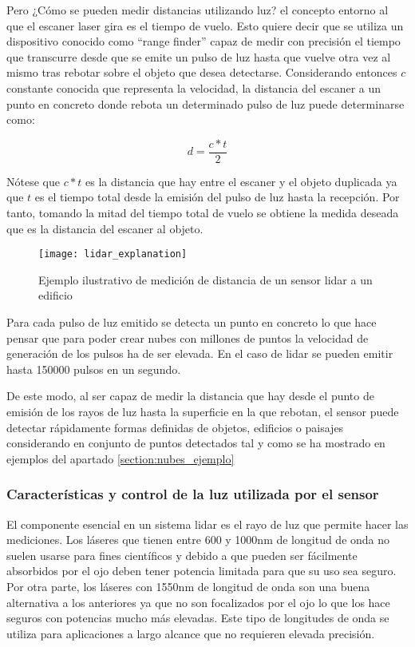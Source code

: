 Pero ¿Cómo se pueden medir distancias utilizando luz?\cite{lidar} el concepto entorno al que el escaner laser gira es el tiempo de vuelo. Esto quiere decir que se utiliza un dispositivo conocido como ``range finder'' capaz de medir con precisión el tiempo que transcurre desde que se emite un pulso de luz hasta que vuelve otra vez al mismo tras rebotar sobre el objeto que desea detectarse. Considerando entonces $c$ constante conocida que representa la velocidad, la distancia del escaner a un punto en concreto donde rebota un determinado pulso de luz puede determinarse como:

$$d = \frac{c*t}{2}$$

Nótese que $c*t$ es la distancia que hay entre el escaner y el objeto duplicada ya que $t$ es el tiempo total desde la emisión del pulso de luz hasta la recepción. Por tanto, tomando la mitad del tiempo total de vuelo se obtiene la medida deseada que es la distancia del escaner al objeto.

\begin{figure}
\centering
{}
  \texttt{[image: lidar\_explanation]}
  \caption{Ejemplo ilustrativo de medición de distancia de un sensor lidar a un edificio}\label{fig:lidar explanation}
\endminipage\hfill

\end{figure}

Para cada pulso de luz emitido se detecta un punto en concreto lo que hace pensar que para poder crear nubes con millones de puntos la velocidad de generación de los pulsos ha de ser elevada. En el caso de lidar se pueden emitir hasta 150000 pulsos en un segundo.

De este modo, al ser capaz de medir la distancia que hay desde el punto de emisión de los rayos de luz hasta la superficie en la que rebotan, el sensor puede detectar rápidamente formas definidas de objetos, edificios o paisajes considerando en conjunto de puntos detectados tal y como se ha mostrado en ejemplos del apartado \ref{section:nubes_ejemplo}

\subsubsection{Características y control de la luz utilizada por el sensor}
El componente esencial en un sistema lidar es el rayo de luz que permite hacer las mediciones. Los láseres que tienen entre 600 y 1000nm de longitud de onda no suelen usarse para fines científicos y debido a que pueden ser fácilmente absorbidos por el ojo deben tener potencia limitada para que su uso sea seguro.
Por otra parte, los láseres con 1550nm de longitud de onda son una buena alternativa a los anteriores ya que no son focalizados por el ojo lo que los hace seguros con potencias mucho más elevadas. Este tipo de longitudes de onda se utiliza para aplicaciones a largo alcance que no requieren elevada precisión. 



